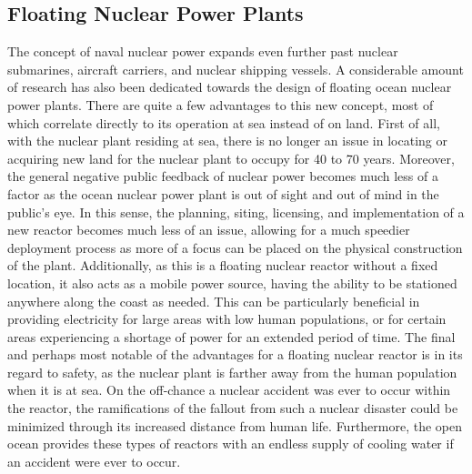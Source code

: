 \documentclass[12pt]{article}
\begin{document}
\subsection{Floating Nuclear Power Plants}
The concept of naval nuclear power expands even further past nuclear submarines, aircraft carriers, and nuclear shipping vessels. A considerable amount of research has also been dedicated towards the design of floating ocean nuclear power plants. There are quite a few advantages to this new concept, most of which correlate directly to its operation at sea instead of on land. First of all, with the nuclear plant residing at sea, there is no longer an issue in locating or acquiring new land for the nuclear plant to occupy for 40 to 70 years. Moreover, the general negative public feedback of nuclear power becomes much less of a factor as the ocean nuclear power plant is out of sight and out of mind in the public’s eye. In this sense, the planning, siting, licensing, and implementation of a new reactor becomes much less of an issue, allowing for a much speedier deployment process as more of a focus can be placed on the physical construction of the plant. Additionally, as this is a floating nuclear reactor without a fixed location, it also acts as a mobile power source, having the ability to be stationed anywhere along the coast as needed. This can be particularly beneficial in providing electricity for large areas with low human populations, or for certain areas experiencing a shortage of power for an extended period of time. The final and perhaps most notable of the advantages for a floating nuclear reactor is in its regard to safety, as the nuclear plant is farther away from the human population when it is at sea. On the off-chance a nuclear accident was ever to occur within the reactor, the ramifications of the fallout from such a nuclear disaster could be minimized through its increased distance from human life. Furthermore, the open ocean provides these types of reactors with an endless supply of cooling water if an accident were ever to occur.
\end{document}
